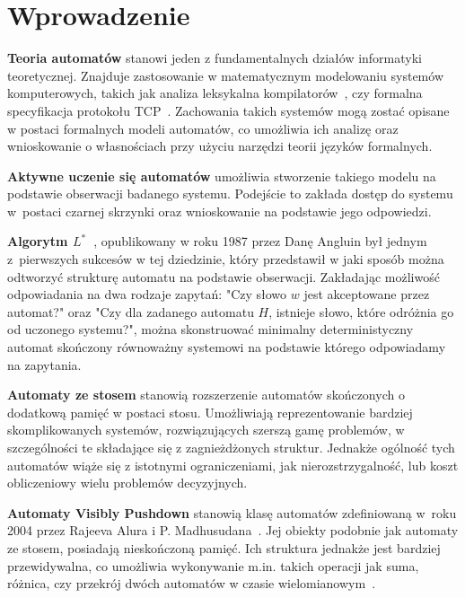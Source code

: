 \chapter{Wprowadzenie}

\textbf{Teoria automatów} stanowi jeden z fundamentalnych działów informatyki teoretycznej. Znajduje zastosowanie w matematycznym
modelowaniu systemów komputerowych, takich jak analiza leksykalna kompilatorów~\cite[3.8.3 DFA's for Lexical Analyzers]{compilers},
czy formalna specyfikacja protokołu TCP~\cite[6.2 The specification of the TCP automaton]{tcp}. Zachowania takich systemów mogą zostać opisane w postaci formalnych modeli automatów, co umożliwia ich analizę oraz
wnioskowanie o własnościach przy użyciu narzędzi teorii języków formalnych.

\textbf{Aktywne uczenie się automatów} umożliwia stworzenie takiego modelu na podstawie obserwacji badanego systemu. Podejście to zakłada
dostęp do systemu w~postaci czarnej skrzynki oraz wnioskowanie na podstawie jego odpowiedzi.

\textbf{Algorytm $L^*$~\cite{Angluin}}, opublikowany w roku 1987 przez Danę Angluin był jednym z~pierwszych sukcesów w tej dziedzinie,
który przedstawił w jaki sposób można odtworzyć strukturę automatu na podstawie obserwacji. Zakładając możliwość odpowiadania na dwa rodzaje zapytań:
"Czy słowo $w$ jest akceptowane przez automat?" oraz "Czy dla zadanego automatu $H$, istnieje słowo, które odróżnia go od uczonego systemu?",
można skonstruować minimalny deterministyczny automat skończony równoważny systemowi na podstawie którego odpowiadamy na zapytania.

\textbf{Automaty ze stosem} stanowią rozszerzenie automatów skończonych o dodatkową pamięć w postaci stosu. Umożliwiają reprezentowanie bardziej
skomplikowanych systemów, rozwiązujących szerszą gamę problemów, w szczególności te składające się z zagnieżdżonych struktur.
Jednakże ogólność tych automatów wiąże się z istotnymi ograniczeniami, jak nierozstrzygalność, lub koszt obliczeniowy wielu problemów decyzyjnych.

\textbf{Automaty Visibly Pushdown} stanowią klasę automatów zdefiniowaną w~roku 2004 przez Rajeeva Alura i P. Madhusudana~\cite{vpl}.
Jej obiekty podobnie jak automaty ze stosem, posiadają nieskończoną pamięć. Ich struktura jednakże jest bardziej przewidywalna,
co umożliwia wykonywanie m.in. takich operacji jak suma, różnica, czy przekrój dwóch automatów w czasie wielomianowym~\cite[2.3 Decision problems]{vpl}.

